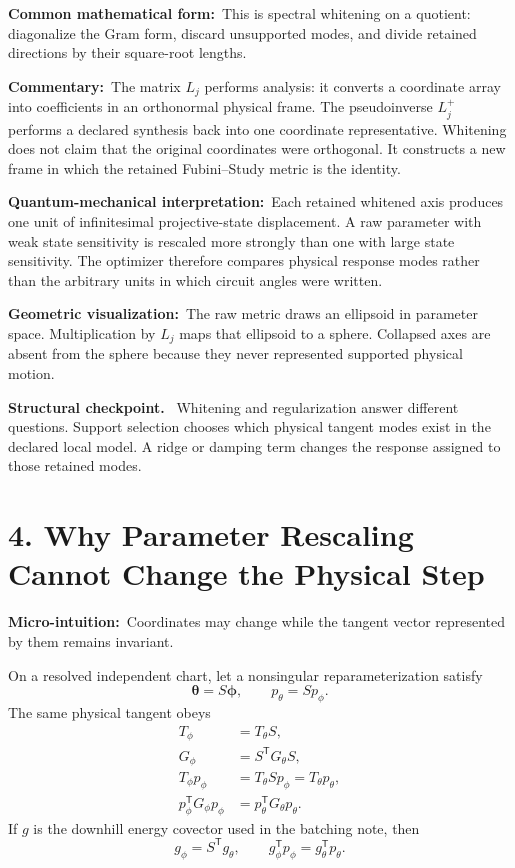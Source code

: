 \documentclass[10pt,twocolumn]{article}
\newcommand{\micro}[1]{\par\noindent\textbf{Micro-intuition:}\ #1\par}
\newcommand{\form}[1]{\par\noindent\textbf{Common mathematical form:}\ #1\par}
\newcommand{\commentary}[1]{\par\noindent\textbf{Commentary:}\ #1\par}
\newcommand{\phys}[1]{\par\noindent\textbf{Quantum-mechanical interpretation:}\ #1\par}
\newcommand{\geom}[1]{\par\noindent\textbf{Geometric visualization:}\ \textcolor{teal!70!black}{#1}\par}
\newcommand{\conceptbreak}{\par\medskip\noindent{\color{black!30}\rule{\columnwidth}{0.35pt}}\par\medskip}
\newenvironment{insight}{\begin{center}\begin{minipage}{0.94\columnwidth}\color{blue!35!black}\textbf{Structural checkpoint.}\ }{\end{minipage}\end{center}}
\begin{document}
\form{This is spectral whitening on a quotient: diagonalize the Gram form,
discard unsupported modes, and divide retained directions by their square-root
lengths.}

\commentary{The matrix \(L_j\) performs analysis: it converts a coordinate
array into coefficients in an orthonormal physical frame. The pseudoinverse
\(L_j^+\) performs a declared synthesis back into one coordinate representative.
Whitening does not claim that the original coordinates were orthogonal. It
constructs a new frame in which the retained Fubini--Study metric is the
identity.}

\phys{Each retained whitened axis produces one unit of infinitesimal
projective-state displacement. A raw parameter with weak state sensitivity is
rescaled more strongly than one with large state sensitivity. The optimizer
therefore compares physical response modes rather than the arbitrary units in
which circuit angles were written.}

\geom{The raw metric draws an ellipsoid in parameter space. Multiplication by
\(L_j\) maps that ellipsoid to a sphere. Collapsed axes are absent from the
sphere because they never represented supported physical motion.}

\begin{insight}
Whitening and regularization answer different questions. Support selection
chooses which physical tangent modes exist in the declared local model. A ridge
or damping term changes the response assigned to those retained modes.
\end{insight}

\conceptbreak

\section*{4. Why Parameter Rescaling Cannot Change the Physical Step}

\micro{Coordinates may change while the tangent vector represented by them
remains invariant.}

On a resolved independent chart, let a nonsingular reparameterization satisfy
\begin{equation}
\bm\theta=S\bm\phi,
\qquad
p_\theta=Sp_\phi.
\label{eq:reparameterization}
\end{equation}
The same physical tangent obeys
\begin{align}
T_\phi&=T_\theta S,
\label{eq:tangent-reparameterization}\\
G_\phi&=S^{\mathsf T}G_\theta S,
\label{eq:metric-reparameterization}\\
T_\phi p_\phi
&=T_\theta Sp_\phi=T_\theta p_\theta,
\label{eq:physical-step-invariance}\\
p_\phi^{\mathsf T}G_\phi p_\phi
&=p_\theta^{\mathsf T}G_\theta p_\theta.
\label{eq:length-invariance}
\end{align}
If \(g\) is the downhill energy covector used in the batching note, then
\begin{equation}
g_\phi=S^{\mathsf T}g_\theta,
\qquad
g_\phi^{\mathsf T}p_\phi=g_\theta^{\mathsf T}p_\theta.
\label{eq:covector-reparameterization}
\end{equation}
\end{document}
